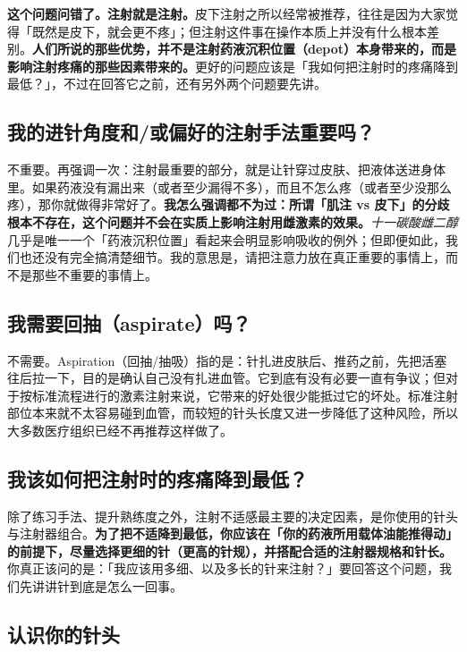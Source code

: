 \documentclass{article}
\begin{document}
\textbf{这个问题问错了。}\textbf{注射就是注射。}皮下注射之所以经常被推荐，往往是因为大家觉得「既然是皮下，就会更不疼」；但注射这件事在操作本质上并没有什么根本差别。\textbf{人们所说的那些优势，并不是注射药液沉积位置（depot）本身带来的，而是影响注射疼痛的那些因素带来的。}更好的问题应该是「我如何把注射时的疼痛降到最低？」，不过在回答它之前，还有另外两个问题要先讲。

\subsection{我的进针角度和/或偏好的注射手法重要吗？}

不重要。再强调一次：注射最重要的部分，就是让针穿过皮肤、把液体送进身体里。如果药液没有漏出来（或者至少漏得不多），而且不怎么疼（或者至少没那么疼），那你就做得非常好了。\textbf{我怎么强调都不为过：所谓「肌注 vs 皮下」的分歧根本不存在，这个问题并不会在实质上影响注射用雌激素的效果。}\textit{十一碳酸雌二醇}几乎是唯一一个「药液沉积位置」看起来会明显影响吸收的例外；但即便如此，我们也还没有完全搞清楚细节。我的意思是，请把注意力放在真正重要的事情上，而不是那些不重要的事情上。

\subsection{我需要回抽（aspirate）吗？}

不需要。Aspiration（回抽/抽吸）指的是：针扎进皮肤后、推药之前，先把活塞往后拉一下，目的是确认自己没有扎进血管。它到底有没有必要一直有争议；但对于按标准流程进行的激素注射来说，它带来的好处很少能抵过它的坏处。标准注射部位本来就不太容易碰到血管，而较短的针头长度又进一步降低了这种风险，所以大多数医疗组织已经不再推荐这样做了。

\subsection{我该如何把注射时的疼痛降到最低？}

除了练习手法、提升熟练度之外，注射不适感最主要的决定因素，是你使用的针头与注射器组合。\textbf{为了把不适降到最低，你应该在「你的药液所用载体油能推得动」的前提下，尽量选择更细的针（更高的针规），并搭配合适的注射器规格和针长。}你真正该问的是：「我应该用多细、以及多长的针来注射？」要回答这个问题，我们先讲讲针到底是怎么一回事。

\subsection*{认识你的针头}
\end{document}

